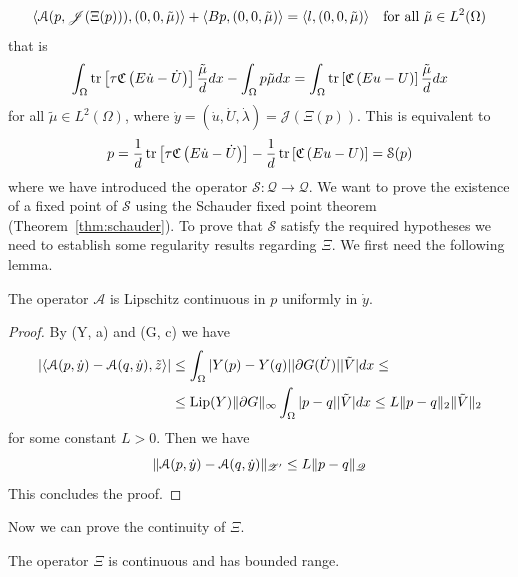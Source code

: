 \[
\langle\mathcal{A}(p,\mathscr{J}(\Xi(p))),(0,0,\tilde\mu)\rangle+\langle Bp,(0,0,\tilde\mu)\rangle=\langle l,(0,0,\tilde\mu)\rangle\quad\text{for all $\tilde\mu\in L^2(\Omega)$}
\]
that is
\[
\int_\Omega\operatorname{tr}\left[\tau\mathfrak{C}\left(E\dot u-\dot U\right)\right]\frac{\tilde\mu}{d}dx-\int_\Omega p\tilde{\mu}dx=\int_\Omega\operatorname{tr}\left[\mathfrak{C}\left(Eu-U\right)\right]\frac{\tilde\mu}{d}dx
\]
for all $\tilde{\mu}\in L^2(\Omega)$, where $\dot y=(\dot u,\dot U,\dot\lambda)=\mathscr{J}(\Xi(p))$. This is equivalent to
\begin{equation}
\label{eqn:p-fixed-point}
p=\frac{1}{d}\operatorname{tr}\left[\tau\mathfrak{C}\left(E\dot u-\dot U\right)\right]-\frac{1}{d}\operatorname{tr}\left[\mathfrak{C}\left(Eu-U\right)\right]=\mathcal{S}(p)
\end{equation}
where we have introduced the operator $\mathcal{S}\colon\mathscr{Q}\to\mathscr{Q}$. We want to prove the existence of a fixed point of $\mathcal{S}$ using the Schauder fixed point theorem (Theorem~\ref{thm:schauder}). To prove that $\mathcal{S}$ satisfy the required hypotheses we need to establish some regularity results regarding $\Xi$. We first need the following lemma.
\begin{lemma}
\label{lemma:lipschitz-A-p}
The operator $\mathcal{A}$ is Lipschitz continuous in $p$ uniformly in $\dot y$.
\end{lemma}
\begin{proof}
By (Y, a) and (G, c) we have
\[
\begin{split}
|\langle\mathcal{A}(p,\dot y)-\mathcal{A}(q,\dot y),\tilde z\rangle|&\le\int_\Omega|Y(p)-Y(q)||\partial G(\dot U)||\tilde V|dx\le\\
&\le\text{Lip}(Y)\lVert\partial G\rVert_\infty\int_\Omega|p-q||\tilde{V}|dx\le L\lVert p-q\rVert_{2}\lVert\tilde V\rVert_2
\end{split}
\]
for some constant $L>0$.
Then we have
\[
\lVert\mathcal{A}(p,\dot y)-\mathcal{A}(q,\dot y)\rVert_{\mathscr{Z}'}\le L\lVert p-q\rVert_\mathscr{Q}
\]
This concludes the proof.
\end{proof}
Now we can prove the continuity of $\Xi$.
\begin{lemma}
\label{lemma:Xi-regularity}
The operator $\Xi$ is continuous and has bounded range.
\end{lemma}
